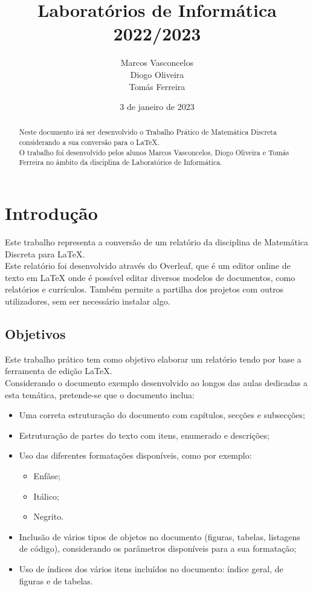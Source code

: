 \documentclass[a4wide]{report}
\title{Laboratórios de Informática\\ 2022/2023}
\author{Marcos Vasconcelos\\Diogo Oliveira\\Tomás Ferreira}
\date{ 3 de janeiro de 2023 }
\begin{document}
\maketitle

\begin{abstract}
    Neste documento irá ser desenvolvido o Trabalho Prático de Matemática Discreta considerando a sua conversão para o LaTeX.\\O trabalho foi desenvolvido pelos alunos Marcos Vasconcelos, Diogo Oliveira e Tomás Ferreira no âmbito da disciplina de Laboratórios de Informática.
\end{abstract}

\tableofcontents
\listoffigures
\listoftables

\chapter{Introdução}
\label{cap:introducao}
Este trabalho representa a conversão de um relatório da disciplina de Matemática Discreta para LaTeX.\\Este relatório foi desenvolvido através do Overleaf, que é um editor online de texto em LaTeX onde é possível editar diversos modelos de documentos, como relatórios e currículos. Também permite a partilha dos projetos com outros utilizadores, sem ser necessário instalar algo.

\section{Objetivos}
Este trabalho prático tem como objetivo elaborar um relatório tendo por base a ferramenta de edição
LaTeX.\\Considerando o documento exemplo desenvolvido ao longos das aulas dedicadas a esta
temática, pretende-se que o documento inclua:
\begin{itemize}
    \item Uma correta estruturação do documento com capítulos, secções e subsecções;
    \item Estruturação de partes do texto com itens, enumerado e descrições;
    \item Uso das diferentes formatações disponíveis, como por exemplo:
    \begin{itemize}
        \item Enfâse;
        \item Itálico;
        \item Negrito.
    \end{itemize}
    \item Inclusão de vários tipos de objetos no documento (figuras, tabelas, listagens de código),
considerando os parâmetros disponíveis para a sua formatação;
    \item Uso de índices dos vários itens incluídos no documento: índice geral, de figuras e de tabelas.
\end{itemize}
\end{document}
